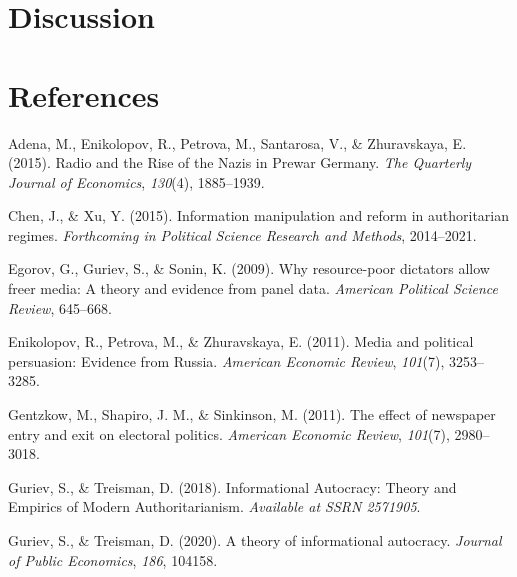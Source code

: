 \documentclass[
  english,
  man]{apa6}
\begin{document}
\hypertarget{discussion}{%
\section{Discussion}\label{discussion}}

\newpage

\hypertarget{references}{%
\section{References}\label{references}}

\begingroup
\setlength{\parindent}{-0.5in}
\setlength{\leftskip}{0.5in}

\hypertarget{refs}{}
\leavevmode\hypertarget{ref-adenaRadioRiseNazis2015}{}%
Adena, M., Enikolopov, R., Petrova, M., Santarosa, V., \& Zhuravskaya, E. (2015). Radio and the Rise of the Nazis in Prewar Germany. \emph{The Quarterly Journal of Economics}, \emph{130}(4), 1885--1939.

\leavevmode\hypertarget{ref-chenInformationManipulationReform2015}{}%
Chen, J., \& Xu, Y. (2015). Information manipulation and reform in authoritarian regimes. \emph{Forthcoming in Political Science Research and Methods}, 2014--2021.

\leavevmode\hypertarget{ref-egorovWhyResourcepoorDictators2009}{}%
Egorov, G., Guriev, S., \& Sonin, K. (2009). Why resource-poor dictators allow freer media: A theory and evidence from panel data. \emph{American Political Science Review}, 645--668.

\leavevmode\hypertarget{ref-enikolopovMediaPoliticalPersuasion2011}{}%
Enikolopov, R., Petrova, M., \& Zhuravskaya, E. (2011). Media and political persuasion: Evidence from Russia. \emph{American Economic Review}, \emph{101}(7), 3253--3285.

\leavevmode\hypertarget{ref-gentzkowEffectNewspaperEntry2011}{}%
Gentzkow, M., Shapiro, J. M., \& Sinkinson, M. (2011). The effect of newspaper entry and exit on electoral politics. \emph{American Economic Review}, \emph{101}(7), 2980--3018.

\leavevmode\hypertarget{ref-gurievInformationalAutocracyTheory2018}{}%
Guriev, S., \& Treisman, D. (2018). Informational Autocracy: Theory and Empirics of Modern Authoritarianism. \emph{Available at SSRN 2571905}.

\leavevmode\hypertarget{ref-gurievTheoryInformationalAutocracy2020}{}%
Guriev, S., \& Treisman, D. (2020). A theory of informational autocracy. \emph{Journal of Public Economics}, \emph{186}, 104158.
\end{document}
